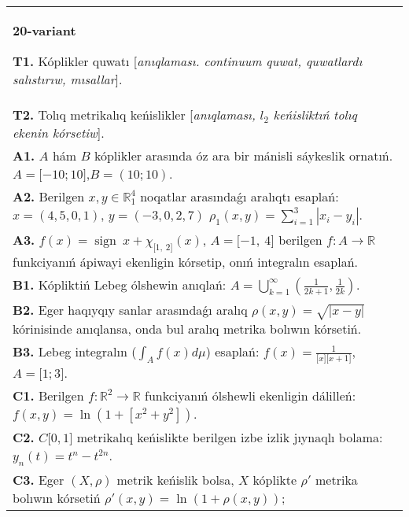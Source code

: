 \documentclass{article}
\DeclareMathOperator{\sign}{sign}
\begin{document}
\begin{tabular}{m{17cm}}
\textbf{20-variant}
\newline

\textbf{T1.} Kóplikler quwatı [\textit{anıqlaması. continuum quwat, quwatlardı salıstırıw, mısallar}]. \\
\textbf{T2.} Tolıq metrikalıq keńislikler [\textit{anıqlaması, \(l_{2}\) keńisliktıń tolıq ekenin kórsetiw}]. \\
\textbf{A1.} \(A\) hám \(B\) kóplikler arasında óz ara bir mánisli sáykeslik ornatıń. \(A = \lbrack - 10;10\rbrack\),\(B = (10;10)\). \\
\textbf{A2.} Berilgen \(x,y \in \mathbb{R}_1^{4}\) noqatlar arasındaǵı aralıqtı esaplań: \(x = (4,5,0,1)\), \(y = ( - 3,0,2,7)\) \(\rho_{1}(x,y) = \sum_{i = 1}^{3}\left| x_{i} - y_{i} \right|\). \\
\textbf{A3.} \(f(x) = \sign \ x + \chi_{\lbrack 1,\ 2\rbrack}(x)\), \(A = \lbrack - 1,\ 4\rbrack\) berilgen \(f:A\rightarrow\mathbb{R}\) funkciyanıń ápiwayi ekenligin kórsetip, onıń integralın esaplań. \\
\textbf{B1.} Kópliktiń Lebeg ólshewin anıqlań: \(A = \bigcup_{k = 1}^{\infty}\left( \frac{1}{2k + 1},\frac{1}{2k} \right)\). \\
\textbf{B2.} Eger haqıyqıy sanlar arasındaǵı aralıq \(\rho(x,y) = \sqrt{|x - y|}\) kórinisinde anıqlansa, onda bul aralıq metrika bolıwın kórsetiń. \\
\textbf{B3.} Lebeg integralın (\(\int_{A}^{}{f(x)d\mu}\)) esaplań: \(f(x) = \frac{1}{\lbrack x\rbrack\lbrack x + 1\rbrack}\), \(A = \lbrack 1;3\rbrack\). \\
\textbf{C1.} Berilgen \(f:\mathbb{R}^{2}\mathbb{\rightarrow R}\) funkciyanıń ólshewli ekenligin dálilleń: \(f(x,y) = \ln\left( 1 + \left\lbrack x^{2} + y^{2} \right\rbrack \right)\). \\
\textbf{C2.} \(C\lbrack 0,1\rbrack\) metrikalıq keńislikte berilgen izbe izlik jıynaqlı bolama: \(y_{n}(t) = t^{n} - t^{2n}\). \\
\textbf{C3.} Eger \((X,\rho)\) metrik keńislik bolsa, \(X\) kóplikte \(\rho'\) metrika bolıwın kórsetiń \(\rho'(x,y) = \ln\left( 1 + \rho(x,y) \right)\); \\

\end{tabular}
\vspace{1cm}
\end{document}
